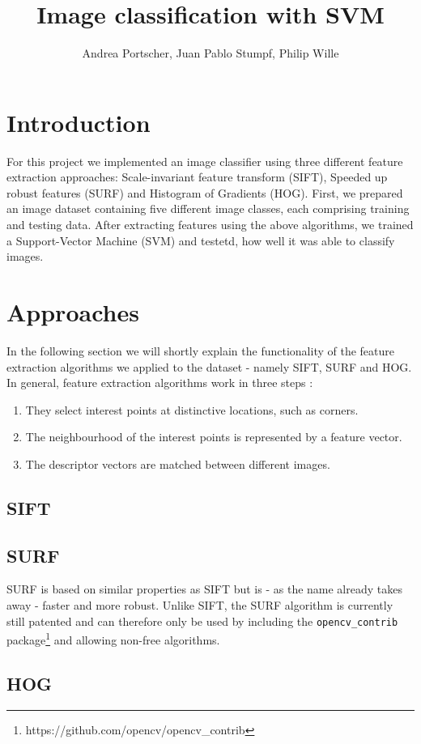 \documentclass{scrartcl}
\title{Image classification with SVM}
\author{Andrea Portscher, Juan Pablo Stumpf, Philip Wille}
\begin{document}
\maketitle

\section{Introduction}
For this project we implemented an image classifier using three different feature extraction approaches: Scale-invariant feature transform (SIFT), Speeded up robust features (SURF) and Histogram of Gradients (HOG). First, we prepared an image dataset containing five different image classes, each comprising training and testing data. After extracting features using the above algorithms, we trained a Support-Vector Machine (SVM) and testetd, how well it was able to classify images.
\section{Approaches}
In the following section we will shortly explain the functionality of the feature extraction algorithms we applied to the dataset - namely SIFT, SURF and HOG.
In general, feature extraction algorithms work in three steps \cite{bay2006}:
\begin{enumerate}
  \item They select interest points at distinctive locations, such as corners.
  \item The neighbourhood of the interest points is represented by a feature vector.
  \item The descriptor vectors are matched between different images.
\end{enumerate}

\subsection{SIFT}
\subsection{SURF}
SURF is based on similar properties as SIFT but is - as the name already takes away - faster and more robust. Unlike SIFT, the SURF algorithm is currently still patented and can therefore only be used by including the \texttt{opencv\_contrib} package\footnote{https://github.com/opencv/opencv\_contrib} and allowing non-free algorithms.

\subsection{HOG}
\end{document}
